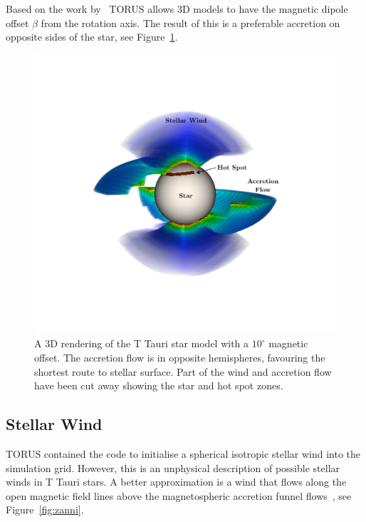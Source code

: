 \documentclass[fleqn,usenatbib]{mnras}
\begin{document}
Based on the work by~\citet{Mahdavi:1998fw} TORUS allows 3D models to have the magnetic dipole offset $\beta$ from the rotation axis. The result of this is a preferable accretion on opposite sides of the star, see Figure~\ref{fig:3Doffset}.
\begin{figure}
    \centering
    \includegraphics[width=\linewidth,trim={2cm 2cm 2cm 2cm},clip]{figures/3Doffset}
    \caption{A 3D rendering of the T Tauri star model with a $10^{\circ}$ magnetic offset. The accretion flow is in opposite hemispheres, favouring the shortest route to stellar surface. Part of the wind and accretion flow have been cut away showing the star and hot spot zones.}
    \label{fig:3Doffset}
\end{figure}

\subsection{Stellar Wind}
\label{sec:wind}
TORUS contained the code to initialise a spherical isotropic stellar wind into the simulation grid. However, this is an unphysical description of possible stellar winds in T Tauri stars. A better approximation is a wind that flows along the open magnetic field lines above the magnetospheric accretion funnel flows~\citep[e.g.][]{2009A&A...508.1117Z,2012MNRAS.426.2901K}, see Figure~\ref{fig:zanni}.
\end{document}
